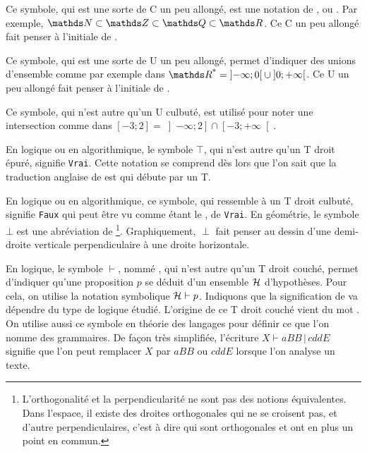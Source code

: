 
\cadre{$\subset$} Ce symbole, qui est une sorte de C un peu allongé, est une notation
de , ou . Par exemple,
$\NN \subset \ZZ \subset \QQ \subset \RR$. Ce C un peu allongé fait penser à l'initiale
de .


\cadre{$\cup$} Ce symbole, qui est une sorte de U un peu allongé, permet d'indiquer
des unions d'ensemble comme par exemple dans
$\RR^\text{*} = \left] -\infty ; 0 \right[ \cup \left] 0 ; +\infty \right[$.
Ce U un peu allongé fait penser à l'initiale de .


\cadre{$\cap$} Ce symbole, qui n'est autre qu'un U culbuté, est utilisé pour noter une intersection comme dans
$\left[ -3 ; 2 \right] = \left] -\infty ; 2 \right] \cap \left[ -3 ; +\infty \right[$.


\cadre{$\top$} En logique ou en algorithmique, le symbole $\top$, qui n'est autre qu'un T droit épuré, signifie \verb+Vrai+. Cette notation se comprend dès lors que l'on sait que la traduction anglaise de  est  qui débute par un T.


\cadre{$\perp$}
En logique ou en algorithmique, ce symbole, qui ressemble à un T droit culbuté, signifie \verb+Faux+ qui peut être vu comme étant le ,  de \verb+Vrai+.
En géométrie, le symbole $\bot$ est une abréviation de 
\footnote{
    L'orthogonalité et la perpendicularité ne sont pas des notions équivalentes. Dans l'espace, il existe des droites orthogonales qui ne se croisent pas, et d'autre perpendiculaires, c'est à dire qui sont orthogonales et ont en plus un point en commun.
}.
Graphiquement, $\perp$ fait penser au dessin d'une demi-droite verticale perpendiculaire à une droite horizontale.


\cadre{$\vdash$} En logique, le symbole $\vdash$, nommé , qui n'est autre qu'un T droit couché, permet d'indiquer qu'une proposition $p$ se déduit d'un ensemble $\cal H$ d'hypothèses. Pour cela, on utilise la notation symbolique ${\cal H} \vdash p$. Indiquons que la signification de  va dépendre du type de logique étudié. L'origine de ce T droit couché vient du mot . On utilise aussi ce symbole en théorie des langages pour définir ce que l'on nomme des grammaires. De façon très simplifiée, l'écriture $X \vdash aBB \,|\, cddE$ signifie que l'on peut remplacer $X$ par $aBB$ ou $cddE$ lorsque l'on analyse un texte.


